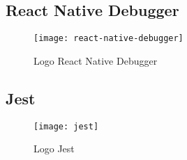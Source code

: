 \subsection{React Native Debugger}
\begin{figure}[H] 
	\centering
	\texttt{[image: react-native-debugger]}
	\caption{Logo React Native Debugger}
\end{figure}

\subsection{Jest}
\begin{figure}[H] 
	\centering
	\texttt{[image: jest]}
	\caption{Logo Jest}
\end{figure}
